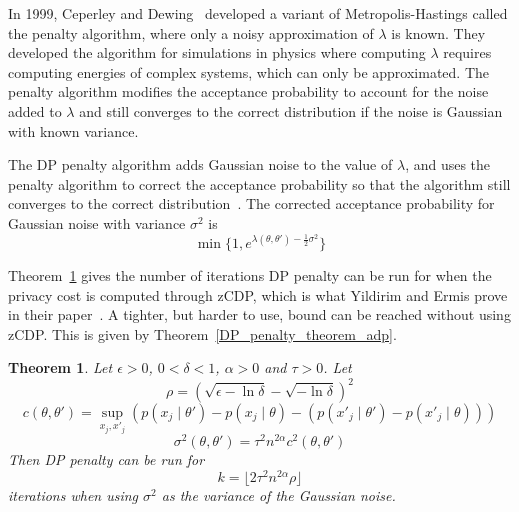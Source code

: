 \documentclass[english,twoside,openright]{HYgraduMLDS}
\newtheorem{theorem}{Theorem}
\begin{document}
In 1999, Ceperley and Dewing~\cite{CeD99} developed a variant of 
Metropolis-Hastings called the penalty 
algorithm, where only a noisy approximation of \(\lambda\) is known. They 
developed the algorithm for simulations in physics where computing \(\lambda\)
requires computing energies of complex systems, which can only be approximated.
The penalty algorithm modifies the acceptance probability to account for the 
noise added to \(\lambda\) and still converges to the correct distribution if 
the noise is Gaussian with known variance.

The DP penalty algorithm adds Gaussian noise to the value of \(\lambda\), and 
uses the penalty algorithm to correct the acceptance probability so that 
the algorithm still converges to the correct distribution~\cite{YildirimE19}.
The corrected acceptance probability for Gaussian noise with variance 
\(\sigma^2\) is 
\[
    \min\{1, e^{\lambda(\theta, \theta') - \frac{1}{2}\sigma^2}\}
\]

Theorem~\ref{DP_penalty_theorem_zcdp} gives the number of iterations DP penalty 
can be run for when the privacy cost is computed through zCDP, which is 
what Yildirim and Ermis prove in their paper~\cite{YildirimE19}. A tighter, but 
harder to use, bound can be reached without using zCDP. This is given by 
Theorem~\ref{DP_penalty_theorem_adp}.

\begin{theorem}\label{DP_penalty_theorem_zcdp}
    Let \(\epsilon > 0\), \(0 < \delta < 1\), \(\alpha > 0\) and \(\tau > 0\).
    Let
    \[
        \rho = (\sqrt{\epsilon - \ln \delta} - \sqrt{-\ln \delta})^2
    \]
    \[
        c(\theta, \theta') = \sup_{x_j, x'_j} (p(x_j\mid \theta') - p(x_j\mid \theta) 
        - (p(x'_j\mid \theta') - p(x'_j\mid \theta)))
    \]
    \[
        \sigma^2(\theta, \theta') = \tau^2 n^{2\alpha}c^2(\theta, \theta')
    \]
    Then DP penalty can be run for 
    \[
        k = \lfloor 2\tau^2 n^{2\alpha} \rho\rfloor
    \]
    iterations when using \(\sigma^2\) as the variance of the Gaussian noise.
\end{theorem}
\end{document}
